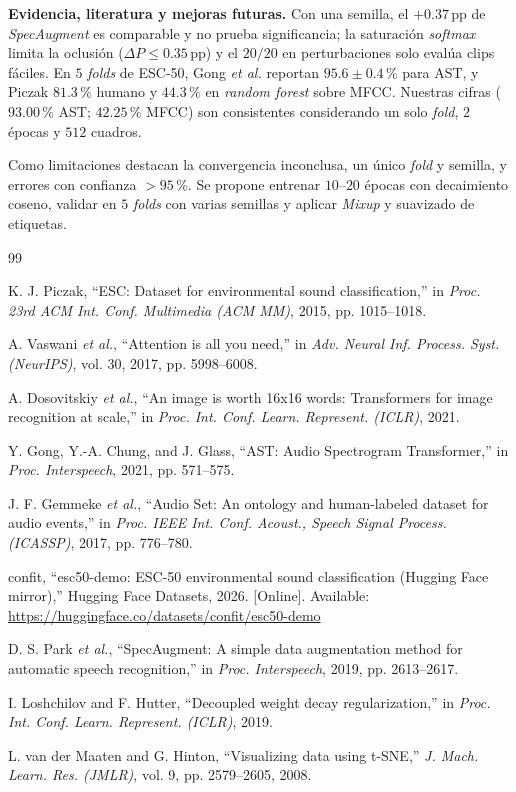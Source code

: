 \documentclass[letterpaper, 10 pt, conference]{ieeeconf}
\begin{document}
\textbf{Evidencia, literatura y mejoras futuras.}
Con una semilla, el $+0.37\,\text{pp}$ de \textit{SpecAugment} \cite{c7} es comparable y no prueba significancia; la saturación \textit{softmax} limita la oclusión ($\Delta P \le 0.35\,\text{pp}$) y el $20/20$ en perturbaciones solo evalúa clips fáciles. En $5$ \textit{folds} de ESC-50, Gong \textit{et al.} \cite{c4} reportan $95.6 \pm 0.4\,\%$ para AST, y Piczak \cite{c1} $81.3\,\%$ humano y $44.3\,\%$ en \textit{random forest} sobre MFCC. Nuestras cifras ($93.00\,\%$ AST; $42.25\,\%$ MFCC) son consistentes considerando un solo \textit{fold}, $2$ épocas y $512$ cuadros.

Como limitaciones destacan la convergencia inconclusa, un único \textit{fold} y semilla, y errores con confianza $>95\,\%$. Se propone entrenar $10$--$20$ épocas con decaimiento coseno, validar en $5$ \textit{folds} con varias semillas y aplicar \textit{Mixup} y suavizado de etiquetas.

\newpage
\begin{thebibliography}{99}
\setlength{\itemsep}{0.2pt}
\setlength{\parskip}{0pt}

 K. J. Piczak, ``ESC: Dataset for environmental sound classification,'' in \textit{Proc. 23rd ACM Int. Conf. Multimedia (ACM MM)}, 2015, pp. 1015--1018.

 A. Vaswani \textit{et al.}, ``Attention is all you need,'' in \textit{Adv. Neural Inf. Process. Syst. (NeurIPS)}, vol. 30, 2017, pp. 5998--6008.

 A. Dosovitskiy \textit{et al.}, ``An image is worth 16x16 words: Transformers for image recognition at scale,'' in \textit{Proc. Int. Conf. Learn. Represent. (ICLR)}, 2021.

 Y. Gong, Y.-A. Chung, and J. Glass, ``AST: Audio Spectrogram Transformer,'' in \textit{Proc. Interspeech}, 2021, pp. 571--575.

 J. F. Gemmeke \textit{et al.}, ``Audio Set: An ontology and human-labeled dataset for audio events,'' in \textit{Proc. IEEE Int. Conf. Acoust., Speech Signal Process. (ICASSP)}, 2017, pp. 776--780.

 confit, ``esc50-demo: ESC-50 environmental sound classification (Hugging Face mirror),'' Hugging Face Datasets, 2026. [Online]. Available: \url{https://huggingface.co/datasets/confit/esc50-demo}

 D. S. Park \textit{et al.}, ``SpecAugment: A simple data augmentation method for automatic speech recognition,'' in \textit{Proc. Interspeech}, 2019, pp. 2613--2617.

 I. Loshchilov and F. Hutter, ``Decoupled weight decay regularization,'' in \textit{Proc. Int. Conf. Learn. Represent. (ICLR)}, 2019.

 L. van der Maaten and G. Hinton, ``Visualizing data using t-SNE,'' \textit{J. Mach. Learn. Res. (JMLR)}, vol. 9, pp. 2579--2605, 2008.

\end{thebibliography}
\end{document}
